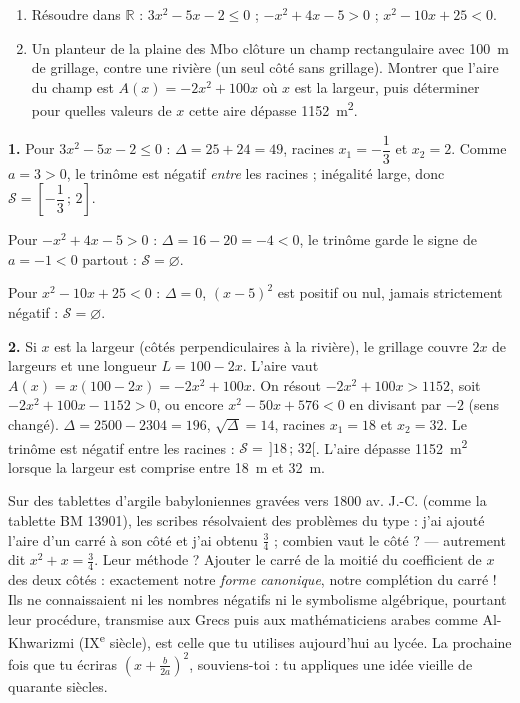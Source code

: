 \documentclass[11pt]{article}
\begin{document}
\begin{exercice}
\begin{enumerate}
\item Résoudre dans $\mathbb{R}$ : $3x^2-5x-2\leq 0$ ; \quad $-x^2+4x-5>0$ ; \quad $x^2-10x+25<0$.
\item Un planteur de la plaine des Mbo clôture un champ rectangulaire avec \SI{100}{m} de grillage, contre une rivière (un seul côté sans grillage). Montrer que l'aire du champ est $A(x)=-2x^2+100x$ où $x$ est la largeur, puis déterminer pour quelles valeurs de $x$ cette aire dépasse \SI{1152}{m^2}.
\end{enumerate}
\end{exercice}

\begin{corrige}[Exercice 1]
\textbf{1.} Pour $3x^2-5x-2\leq 0$ : $\Delta=25+24=49$, racines $x_1=-\dfrac{1}{3}$ et $x_2=2$. Comme $a=3>0$, le trinôme est négatif \emph{entre} les racines ; inégalité large, donc $\mathcal{S}=\left[-\dfrac{1}{3}\,;\,2\right]$.

Pour $-x^2+4x-5>0$ : $\Delta=16-20=-4<0$, le trinôme garde le signe de $a=-1<0$ partout : $\mathcal{S}=\varnothing$.

Pour $x^2-10x+25<0$ : $\Delta=0$, $(x-5)^2$ est positif ou nul, jamais strictement négatif : $\mathcal{S}=\varnothing$.

\textbf{2.} Si $x$ est la largeur (côtés perpendiculaires à la rivière), le grillage couvre $2x$ de largeurs et une longueur $L=100-2x$. L'aire vaut $A(x)=x(100-2x)=-2x^2+100x$. On résout $-2x^2+100x>1152$, soit $-2x^2+100x-1152>0$, ou encore $x^2-50x+576<0$ en divisant par $-2$ (sens changé). $\Delta=2500-2304=196$, $\sqrt{\Delta}=14$, racines $x_1=18$ et $x_2=32$. Le trinôme est négatif entre les racines : $\mathcal{S}=\,]18\,;\,32[$. L'aire dépasse \SI{1152}{m^2} lorsque la largeur est comprise entre \SI{18}{m} et \SI{32}{m}.
\end{corrige}

\begin{savaistu}
Sur des tablettes d'argile babyloniennes gravées vers 1800 av. J.-C. (comme la tablette BM 13901), les scribes résolvaient des problèmes du type : \og j'ai ajouté l'aire d'un carré à son côté et j'ai obtenu $\frac{3}{4}$ ; combien vaut le côté ? \fg{} — autrement dit $x^2+x=\frac{3}{4}$. Leur méthode ? Ajouter le carré de la moitié du coefficient de $x$ des deux côtés : exactement notre \emph{forme canonique}, notre \og complétion du carré \fg{} ! Ils ne connaissaient ni les nombres négatifs ni le symbolisme algébrique, pourtant leur procédure, transmise aux Grecs puis aux mathématiciens arabes comme Al-Khwarizmi (IX\textsuperscript{e} siècle), est celle que tu utilises aujourd'hui au lycée. La prochaine fois que tu écriras $\left(x+\frac{b}{2a}\right)^2$, souviens-toi : tu appliques une idée vieille de quarante siècles.
\end{savaistu}
\end{document}
